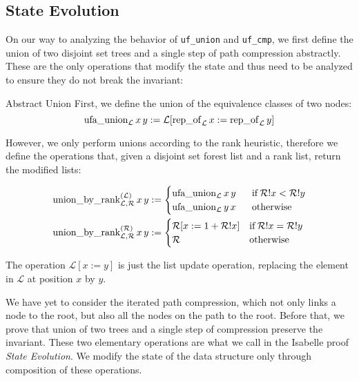 \documentclass[headsepline,footsepline,footinclude=false,oneside,fontsize=11pt,paper=a4,listof=totoc,bibliography=totoc]{scrbook} %
\begin{document}
\subsection{State Evolution}

On our way to analyzing the behavior of \verb|uf_union| and \verb|uf_cmp|, we first define the union of two disjoint set trees and a single step of path compression abstractly. These are the only operations that modify the state and thus need to be analyzed to ensure they do not break the invariant:

\begin{definition}{Abstract Union}
	\newline
	First, we define the union of the equivalence classes of two nodes:
	\begin{equation}
	\mathrm{ufa\_union}_{\mathcal{L}}\, x \, y := \mathcal{L}[\mathrm{rep\_of}_\mathcal{L}\, x := \mathrm{rep\_of}_\mathcal{L}\, y]
	\end{equation}
	
	However, we only perform unions according to the rank heuristic, therefore we define the operations that, given a disjoint set forest list and a rank list, return the modified lists:
	
	\begin{align}
	\mathrm{union\_by\_rank^{(\mathcal{L})}_{\mathcal{L},\mathcal{R}}}\, x\,y &:= \begin{cases} \mathrm{ufa\_union}_{\mathcal{L}}\, x\,y &\,\,\,\, \mathrm{if} \, \mathcal{R}!x < \mathcal{R}!y \\\mathrm{ufa\_union}_{\mathcal{L}}\, y\,x &\,\,\,\, \mathrm{otherwise}
	\end{cases}
	\\
	\mathrm{union\_by\_rank^{(\mathcal{R})}_{\mathcal{L},\mathcal{R}}}\, x\, y &:= \begin{cases} \mathcal{R}[x := 1 + \mathcal{R}!x] & \mathrm{if} \, \mathcal{R}!x = \mathcal{R}!y \\\mathcal{R} & \mathrm{otherwise}
	\end{cases}
	\end{align}
	
	The operation $\mathcal{L}[x := y]$ is just the list update operation, replacing the element in $\mathcal{L}$ at position $x$ by $y$.
	
\end{definition}


We have yet to consider the iterated path compression, which not only links a node to the root, but also all the nodes on the path to the root. Before that, we prove that union of two trees and a single step of compression preserve the invariant. These two elementary operations are what we call in the Isabelle proof \textit{State Evolution}. We modify the state of the data structure only through composition of these operations.
\end{document}
